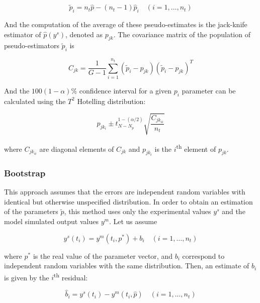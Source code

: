\begin{equation}
	\tilde{p}_i=n_t \hat{p} - (n_t -1) \hat{p}_i \quad (i=1, \ldots , n_t)
\label{eq:jackknifepseudo}
\end{equation}

And the computation of the average of these pseudo-estimates is the jack-knife estimator of $\hat{p}(y^s)$, denoted as $p_{jk}$. The covariance matrix of the population of pseudo-estimators $\tilde{p}_i$ is

\begin{equation}
	C_{jk}= \frac{1}{G-1}\sum_{i=1}^{n_t} (\tilde{p}_i-p_{jk})(\tilde{p}_i-p_{jk})^T
\label{eq:jackknifecovariance}
\end{equation}

And the $100(1-\alpha)\%$ confidence interval for a given $p_i$ parameter can be calculated using the $T^2$ Hotelling distribution:

\begin{equation}
	p_{jk_i}\pm t^{1-(\alpha/2)}_{N-N_p}\sqrt{\frac{C_{jk_{ii}}}{n_t}}
\label{eq:jackknifeconfidence}
\end{equation}

where $C_{jk_{ii}}$ are diagonal elements of $C_{jk}$ and $p_{jk_i}$ is the $i$\textsuperscript{th} element of $p_{jk}$.

\subsubsection{Bootstrap}
\label{sec:Bootstrap}

This approach assumes that the errors are independent random variables with identical but otherwise unspecified distribution. In order to obtain an estimation of the parameters $\tilde{p}$, this method uses only the experimental values $y^s$ and the model simulated output values $y^m$. Let us assume

\begin{equation}
	y^s(t_i)=y^m(t_i,p^{*})+b_i \quad (i=1, \ldots , n_t)
\label{eq:bootstrapy}
\end{equation}

where $p^{*}$ is the real value of the parameter vector, and $b_i$ correspond to independent random variables with the same distribution. Then, an estimate of $b_i$ is given by the $i$\textsuperscript{th} residual:

\begin{equation}
	\hat{b}_i = y^s(t_i)-y^m(t_i,\hat{p}) \quad (i=1, \ldots , n_t)
\label{eq:bootstrapbi}
\end{equation}

